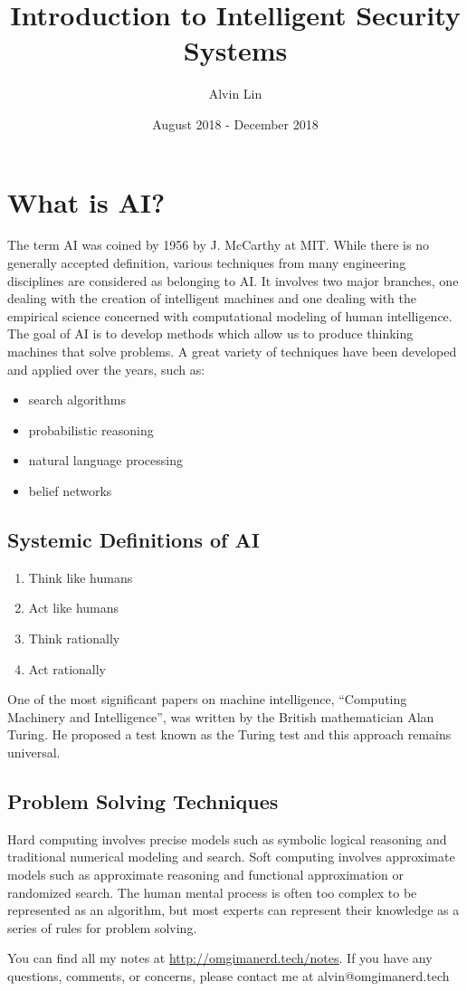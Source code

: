 \documentclass{math}
\title{Introduction to Intelligent Security Systems}
\author{Alvin Lin}
\date{August 2018 - December 2018}
\begin{document}
\maketitle

\section*{What is AI?}
The term AI was coined by 1956 by J. McCarthy at MIT. While there is no
generally accepted definition, various techniques from many engineering
disciplines are considered as belonging to AI. It involves two major branches,
one dealing with the creation of intelligent machines and one dealing with the
empirical science concerned with computational modeling of human intelligence.
The goal of AI is to develop methods which allow us to produce thinking machines
that solve problems. A great variety of techniques have been developed and
applied over the years, such as:
\begin{itemize}
  \item search algorithms
  \item probabilistic reasoning
  \item natural language processing
  \item belief networks
\end{itemize}

\subsection*{Systemic Definitions of AI}
\begin{enumerate}
  \item Think like humans
  \item Act like humans
  \item Think rationally
  \item Act rationally
\end{enumerate}
One of the most significant papers on machine intelligence, ``Computing
Machinery and Intelligence'', was written by the British mathematician Alan
Turing. He proposed a test known as the Turing test and this approach remains
universal.

\subsection*{Problem Solving Techniques}
Hard computing involves precise models such as symbolic logical reasoning and
traditional numerical modeling and search. Soft computing involves approximate
models such as approximate reasoning and functional approximation or randomized
search. The human mental process is often too complex to be represented as an
algorithm, but most experts can represent their knowledge as a series of rules
for problem solving.

\begin{center}
  You can find all my notes at \url{http://omgimanerd.tech/notes}. If you have
  any questions, comments, or concerns, please contact me at
  alvin@omgimanerd.tech
\end{center}
\end{document}
